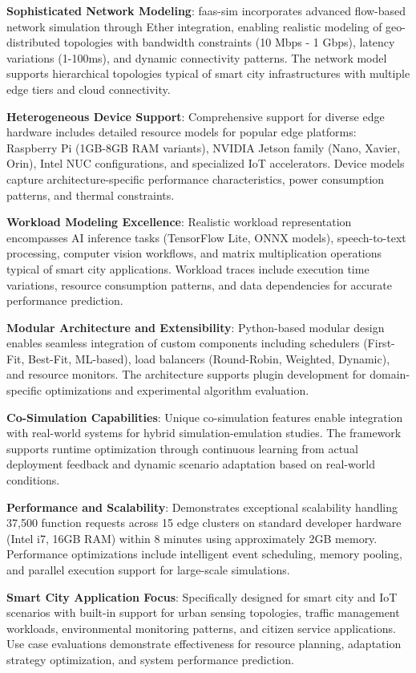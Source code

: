 \textbf{Sophisticated Network Modeling}: faas-sim incorporates advanced flow-based network simulation through Ether integration, enabling realistic modeling of geo-distributed topologies with bandwidth constraints (10 Mbps - 1 Gbps), latency variations (1-100ms), and dynamic connectivity patterns. The network model supports hierarchical topologies typical of smart city infrastructures with multiple edge tiers and cloud connectivity.

\textbf{Heterogeneous Device Support}: Comprehensive support for diverse edge hardware includes detailed resource models for popular edge platforms: Raspberry Pi (1GB-8GB RAM variants), NVIDIA Jetson family (Nano, Xavier, Orin), Intel NUC configurations, and specialized IoT accelerators. Device models capture architecture-specific performance characteristics, power consumption patterns, and thermal constraints.

\textbf{Workload Modeling Excellence}: Realistic workload representation encompasses AI inference tasks (TensorFlow Lite, ONNX models), speech-to-text processing, computer vision workflows, and matrix multiplication operations typical of smart city applications. Workload traces include execution time variations, resource consumption patterns, and data dependencies for accurate performance prediction.

\textbf{Modular Architecture and Extensibility}: Python-based modular design enables seamless integration of custom components including schedulers (First-Fit, Best-Fit, ML-based), load balancers (Round-Robin, Weighted, Dynamic), and resource monitors. The architecture supports plugin development for domain-specific optimizations and experimental algorithm evaluation.

\textbf{Co-Simulation Capabilities}: Unique co-simulation features enable integration with real-world systems for hybrid simulation-emulation studies. The framework supports runtime optimization through continuous learning from actual deployment feedback and dynamic scenario adaptation based on real-world conditions.

\textbf{Performance and Scalability}: Demonstrates exceptional scalability handling 37,500 function requests across 15 edge clusters on standard developer hardware (Intel i7, 16GB RAM) within 8 minutes using approximately 2GB memory. Performance optimizations include intelligent event scheduling, memory pooling, and parallel execution support for large-scale simulations.

\textbf{Smart City Application Focus}: Specifically designed for smart city and IoT scenarios with built-in support for urban sensing topologies, traffic management workloads, environmental monitoring patterns, and citizen service applications. Use case evaluations demonstrate effectiveness for resource planning, adaptation strategy optimization, and system performance prediction.

